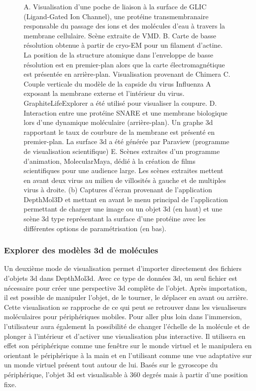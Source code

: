 \begin{figure}[h]
{{A. Visualisation d'une poche de liaison à la surface de GLIC (Ligand-Gated Ion Channel), une protéine transmembranaire responsable du passage des ions et des molécules d'eau à travers la membrane cellulaire. Scène extraite de VMD. B. Carte de basse résolution obtenue à partir de cryo-EM pour un filament d'actine. La position de la structure atomique dans l'enveloppe de basse résolution est en premier-plan alors que la carte électromagnétique est présentée en arrière-plan. Visualisation provenant de Chimera C. Couple verticale du modèle de la capside du virus Influenza A exposant la membrane externe et l'intérieur du virus. GraphiteLifeExplorer a été utilisé pour visualiser la coupure. D. Interaction entre une protéine SNARE et une membrane biologique lors d'une dynamique moléculaire (arrière-plan). Un graphe 3d rapportant le taux de courbure de la membrane est présenté en premier-plan. La surface 3d a été générée par Paraview (programme de visualisation scientifique) E. Scènes extraites d'un programme d'animation, MolecularMaya, dédié à la création de films scientifiques pour une audience large. Les scènes extraites mettent en avant deux virus au milieu de villosités à gauche et de multiples virus à droite.
(b) Captures d'écran provenant de l'application DepthMol3D et mettant en avant le menu principal de l'application permettant de charger une image ou un objet 3d (en haut) et une scène 3d type représentant la surface d'une protéine avec les différentes options de paramétrisation (en bas).}}
\end{figure}

\subsubsection{Explorer des modèles 3d de molécules}

Un deuxième mode de visualisation permet d'importer directement des fichiers d'objets 3d dans DepthMol3d. Avec ce type de données 3d, un seul fichier est nécessaire pour créer une perspective 3d complète de l'objet. Après importation, il est possible de manipuler l'objet, de le tourner, le déplacer en avant ou arrière. Cette visualisation se rapproche de ce qui peut se retrouver dans les visualiseurs moléculaires pour périphériques mobiles.
Pour aller plus loin dans l'immersion, l'utilisateur aura également la possibilité de changer l'échelle de la molécule et de plonger à l'intérieur et d'activer une visualisation plus interactive.
Il utilisera en effet son périphérique comme une fenêtre sur le monde virtuel et le manipulera en orientant le périphérique à la main et en l'utilisant comme une vue adaptative sur un monde virtuel présent tout autour de lui. Basés sur le gyroscope du périphérique, l'objet 3d est visualisable à 360 degrés mais à partir d'une position fixe. 

